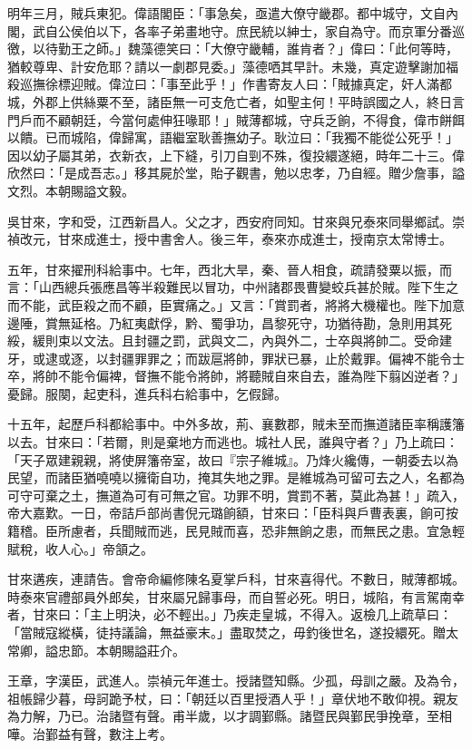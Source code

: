 \begin{pinyinscope}
明年三月，賊兵東犯。偉語閣臣：「事急矣，亟遣大僚守畿郡。都中城守，文自內閣，武自公侯伯以下，各率子弟畫地守。庶民統以紳士，家自為守。而京軍分番巡徼，以待勤王之師。」魏藻德笑曰：「大僚守畿輔，誰肯者？」偉曰：「此何等時，猶較尊卑、計安危耶？請以一劇郡見委。」藻德哂其早計。未幾，真定遊擊謝加福殺巡撫徐標迎賊。偉泣曰：「事至此乎！」作書寄友人曰：「賊據真定，奸人滿都城，外郡上供絲粟不至，諸臣無一可支危亡者，如聖主何！平時誤國之人，終日言門戶而不顧朝廷，今當何處伸狂喙耶！」賊薄都城，守兵乏餉，不得食，偉市餅餌以饋。已而城陷，偉歸寓，語繼室耿善撫幼子。耿泣曰：「我獨不能從公死乎！」因以幼子屬其弟，衣新衣，上下縫，引刀自剄不殊，復投繯遂絕，時年二十三。偉欣然曰：「是成吾志。」移其屍於堂，貽子觀書，勉以忠孝，乃自經。贈少詹事，謚文烈。本朝賜謚文毅。

吳甘來，字和受，江西新昌人。父之才，西安府同知。甘來與兄泰來同舉鄉試。崇禎改元，甘來成進士，授中書舍人。後三年，泰來亦成進士，授南京太常博士。

五年，甘來擢刑科給事中。七年，西北大旱，秦、晉人相食，疏請發粟以振，而言：「山西總兵張應昌等半殺難民以冒功，中州諸郡畏曹變蛟兵甚於賊。陛下生之而不能，武臣殺之而不顧，臣實痛之。」又言：「賞罰者，將將大機權也。陛下加意邊陲，賞無延格。乃紅夷獻俘，黔、蜀爭功，昌黎死守，功猶待勘，急則用其死綏，緩則束以文法。且封疆之罰，武與文二，內與外二，士卒與將帥二。受命建牙，或逮或逐，以封疆罪罪之；而跋扈將帥，罪狀已暴，止於戴罪。偏裨不能令士卒，將帥不能令偏裨，督撫不能令將帥，將聽賊自來自去，誰為陛下翦凶逆者？」憂歸。服闋，起吏科，進兵科右給事中，乞假歸。

十五年，起歷戶科都給事中。中外多故，荊、襄數郡，賊未至而撫道諸臣率稱護籓以去。甘來曰：「若爾，則是棄地方而逃也。城社人民，誰與守者？」乃上疏曰：「天子眾建親親，將使屏籓帝室，故曰『宗子維城』。乃烽火纔傳，一朝委去以為民望，而諸臣猶嘵嘵以擁衛自功，掩其失地之罪。是維城為可留可去之人，名都為可守可棄之土，撫道為可有可無之官。功罪不明，賞罰不著，莫此為甚！」疏入，帝大嘉歎。一日，帝詰戶部尚書倪元璐餉額，甘來曰：「臣科與戶曹表裏，餉可按籍稽。臣所慮者，兵聞賊而逃，民見賊而喜，恐非無餉之患，而無民之患。宜急輕賦稅，收人心。」帝頷之。

甘來遘疾，連請告。會帝命編修陳名夏掌戶科，甘來喜得代。不數日，賊薄都城。時泰來官禮部員外郎矣，甘來屬兄歸事母，而自誓必死。明日，城陷，有言駕南幸者，甘來曰：「主上明決，必不輕出。」乃疾走皇城，不得入。返檢几上疏草曰：「當賊寇縱橫，徒持議論，無益豪末。」盡取焚之，毋釣後世名，遂投繯死。贈太常卿，謚忠節。本朝賜謚莊介。

王章，字漢臣，武進人。崇禎元年進士。授諸暨知縣。少孤，母訓之嚴。及為令，祖帳歸少暮，母訶跪予杖，曰：「朝廷以百里授酒人乎！」章伏地不敢仰視。親友為力解，乃已。治諸暨有聲。甫半歲，以才調鄞縣。諸暨民與鄞民爭挽章，至相嘩。治鄞益有聲，數注上考。


\end{pinyinscope}
